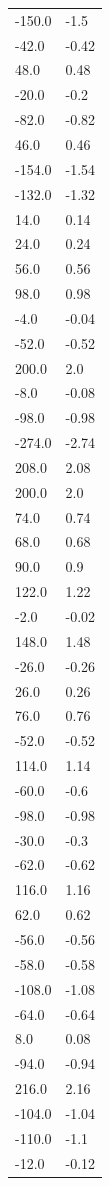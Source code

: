 \begin{longtable}{ll}
-150.0 & -1.5 \\
-42.0 & -0.42 \\
48.0 & 0.48 \\
-20.0 & -0.2 \\
-82.0 & -0.82 \\
46.0 & 0.46 \\
-154.0 & -1.54 \\
-132.0 & -1.32 \\
14.0 & 0.14 \\
24.0 & 0.24 \\
56.0 & 0.56 \\
98.0 & 0.98 \\
-4.0 & -0.04 \\
-52.0 & -0.52 \\
200.0 & 2.0 \\
-8.0 & -0.08 \\
-98.0 & -0.98 \\
-274.0 & -2.74 \\
208.0 & 2.08 \\
200.0 & 2.0 \\
74.0 & 0.74 \\
68.0 & 0.68 \\
90.0 & 0.9 \\
122.0 & 1.22 \\
-2.0 & -0.02 \\
148.0 & 1.48 \\
-26.0 & -0.26 \\
26.0 & 0.26 \\
76.0 & 0.76 \\
-52.0 & -0.52 \\
114.0 & 1.14 \\
-60.0 & -0.6 \\
-98.0 & -0.98 \\
-30.0 & -0.3 \\
-62.0 & -0.62 \\
116.0 & 1.16 \\
62.0 & 0.62 \\
-56.0 & -0.56 \\
-58.0 & -0.58 \\
-108.0 & -1.08 \\
-64.0 & -0.64 \\
8.0 & 0.08 \\
-94.0 & -0.94 \\
216.0 & 2.16 \\
-104.0 & -1.04 \\
-110.0 & -1.1 \\
-12.0 & -0.12 \\

\end{longtable}
